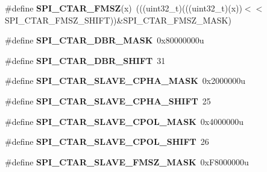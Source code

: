 \begin{DoxyCompactItemize}
\item 
\#define {\bfseries S\+P\+I\+\_\+\+C\+T\+A\+R\+\_\+\+F\+M\+SZ}(x)~(((uint32\+\_\+t)(((uint32\+\_\+t)(x))$<$$<$S\+P\+I\+\_\+\+C\+T\+A\+R\+\_\+\+F\+M\+S\+Z\+\_\+\+S\+H\+I\+FT))\&S\+P\+I\+\_\+\+C\+T\+A\+R\+\_\+\+F\+M\+S\+Z\+\_\+\+M\+A\+SK)\hypertarget{group__SPI__Register__Masks_ga217a65114bc44312a9c953c3fd394464}{}\label{group__SPI__Register__Masks_ga217a65114bc44312a9c953c3fd394464}

\item 
\#define {\bfseries S\+P\+I\+\_\+\+C\+T\+A\+R\+\_\+\+D\+B\+R\+\_\+\+M\+A\+SK}~0x80000000u\hypertarget{group__SPI__Register__Masks_ga3347aad10c0b5dc1a5062275e89353b2}{}\label{group__SPI__Register__Masks_ga3347aad10c0b5dc1a5062275e89353b2}

\item 
\#define {\bfseries S\+P\+I\+\_\+\+C\+T\+A\+R\+\_\+\+D\+B\+R\+\_\+\+S\+H\+I\+FT}~31\hypertarget{group__SPI__Register__Masks_ga4600954a3cc5c07f14c1b0e602cec4cd}{}\label{group__SPI__Register__Masks_ga4600954a3cc5c07f14c1b0e602cec4cd}

\item 
\#define {\bfseries S\+P\+I\+\_\+\+C\+T\+A\+R\+\_\+\+S\+L\+A\+V\+E\+\_\+\+C\+P\+H\+A\+\_\+\+M\+A\+SK}~0x2000000u\hypertarget{group__SPI__Register__Masks_ga3e8aa9f143abc35fcb9f86e5de378621}{}\label{group__SPI__Register__Masks_ga3e8aa9f143abc35fcb9f86e5de378621}

\item 
\#define {\bfseries S\+P\+I\+\_\+\+C\+T\+A\+R\+\_\+\+S\+L\+A\+V\+E\+\_\+\+C\+P\+H\+A\+\_\+\+S\+H\+I\+FT}~25\hypertarget{group__SPI__Register__Masks_ga6470631f0d2f0d7722ab55a1f97c936e}{}\label{group__SPI__Register__Masks_ga6470631f0d2f0d7722ab55a1f97c936e}

\item 
\#define {\bfseries S\+P\+I\+\_\+\+C\+T\+A\+R\+\_\+\+S\+L\+A\+V\+E\+\_\+\+C\+P\+O\+L\+\_\+\+M\+A\+SK}~0x4000000u\hypertarget{group__SPI__Register__Masks_ga57c0bdc9ff5183b0e8da776a8d803ff1}{}\label{group__SPI__Register__Masks_ga57c0bdc9ff5183b0e8da776a8d803ff1}

\item 
\#define {\bfseries S\+P\+I\+\_\+\+C\+T\+A\+R\+\_\+\+S\+L\+A\+V\+E\+\_\+\+C\+P\+O\+L\+\_\+\+S\+H\+I\+FT}~26\hypertarget{group__SPI__Register__Masks_ga183134048ae879b82e3aa07b4a51d79d}{}\label{group__SPI__Register__Masks_ga183134048ae879b82e3aa07b4a51d79d}

\item 
\#define {\bfseries S\+P\+I\+\_\+\+C\+T\+A\+R\+\_\+\+S\+L\+A\+V\+E\+\_\+\+F\+M\+S\+Z\+\_\+\+M\+A\+SK}~0x\+F8000000u\hypertarget{group__SPI__Register__Masks_ga5230074b3809e2ef525e87fdca078717}{}\label{group__SPI__Register__Masks_ga5230074b3809e2ef525e87fdca078717}


\end{DoxyCompactItemize}
